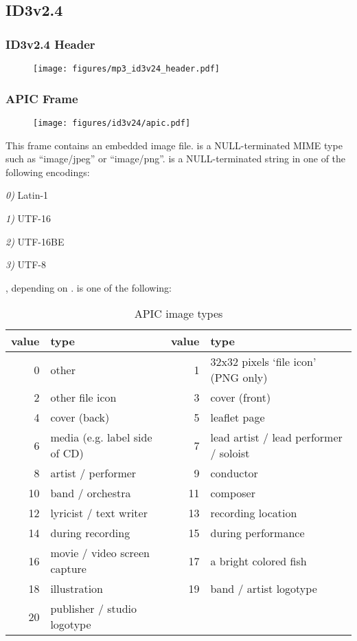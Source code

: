 \clearpage

\subsection{ID3v2.4}
\subsubsection{ID3v2.4 Header}
\begin{figure}[h]
\texttt{[image: figures/mp3\_id3v24\_header.pdf]}
\end{figure}

\subsubsection{APIC Frame}
\begin{figure}[h]
\texttt{[image: figures/id3v24/apic.pdf]}
\end{figure}
This frame contains an embedded image file.
 is a NULL-terminated MIME type such as ``image/jpeg''
or ``image/png''.
 is a NULL-terminated string
in one of the following encodings:
\begin{inparaenum}
\item[\itshape 0\upshape)] Latin-1
\item[\itshape 1\upshape)] UTF-16
\item[\itshape 2\upshape)] UTF-16BE
\item[\itshape 3\upshape)] UTF-8
\end{inparaenum}
, depending on .
 is one of the following:
\begin{table}[h]
{
\begin{tabular}{|r|l||r|l|}
\hline
value & type & value & type \\
\hline
0 & other & 1 & 32x32 pixels `file icon' (PNG only) \\
2 & other file icon & 3 & cover (front) \\
4 & cover (back) & 5 & leaflet page \\
6 & media (e.g. label side of CD) & 7 & lead artist / lead performer / soloist \\
8 & artist / performer & 9 & conductor \\
10 & band / orchestra & 11 & composer \\
12 & lyricist / text writer & 13 & recording location \\
14 & during recording & 15 & during performance \\
16 & movie / video screen capture & 17 & a bright colored fish \\
18 & illustration & 19 & band / artist logotype \\
20 & publisher / studio logotype & &  \\
\hline
\end{tabular}
\caption{APIC image types}
}
\end{table}

